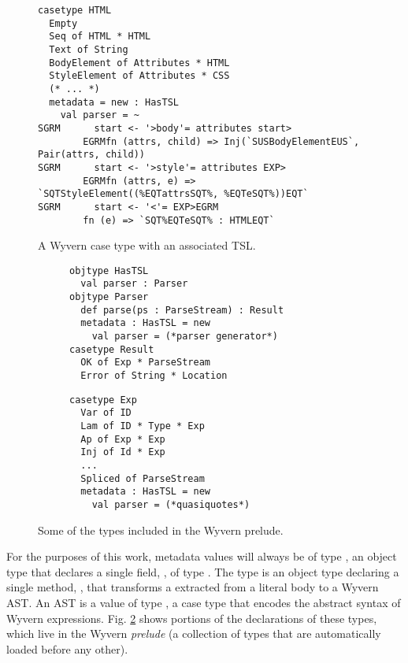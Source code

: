 \begin{figure}[t]
\begin{lstlisting}
casetype HTML 
  Empty
  Seq of HTML * HTML 
  Text of String
  BodyElement of Attributes * HTML
  StyleElement of Attributes * CSS
  (* ... *)
  metadata = new : HasTSL
    val parser = ~
SGRM      start <- '>body'= attributes start>
        EGRMfn (attrs, child) => Inj(`SUSBodyElementEUS`, Pair(attrs, child))
SGRM      start <- '>style'= attributes EXP>
        EGRMfn (attrs, e) => `SQTStyleElement((%EQTattrsSQT%, %EQTeSQT%))EQT`
SGRM      start <- '<'= EXP>EGRM 
        fn (e) => `SQT%EQTeSQT% : HTMLEQT`
\end{lstlisting}
\caption{A Wyvern case type with an associated TSL.}
\label{f-htmltype}
\end{figure}
\begin{figure}[t]
\begin{subfigure}[t]{.54\textwidth}
\begin{lstlisting}
objtype HasTSL
  val parser : Parser
objtype Parser                          
  def parse(ps : ParseStream) : Result
  metadata : HasTSL = new
    val parser = (*parser generator*)
casetype Result
  OK of Exp * ParseStream
  Error of String * Location  
\end{lstlisting}
\end{subfigure}
\begin{subfigure}[t]{.42\textwidth}
\begin{lstlisting}[linewidth=.42\textwidth,firstnumber=10]
casetype Exp 
  Var of ID
  Lam of ID * Type * Exp
  Ap of Exp * Exp
  Inj of Id * Exp
  ... 
  Spliced of ParseStream
  metadata : HasTSL = new
    val parser = (*quasiquotes*)
\end{lstlisting}
\end{subfigure}
\caption{Some of the types included in the Wyvern prelude.}
\label{f-prelude}
\end{figure}

For the purposes of this work, metadata values will always be of type , an object type that declares a single field, , of type . The  type is an object type declaring a single method, , that transforms a  extracted from a literal body to a Wyvern AST. An AST is a value of type , a case type that encodes the abstract syntax of Wyvern expressions. Fig. \ref{f-prelude} shows portions of the declarations of these types, which live in the Wyvern \emph{prelude} (a collection of types that are automatically loaded before any other).

